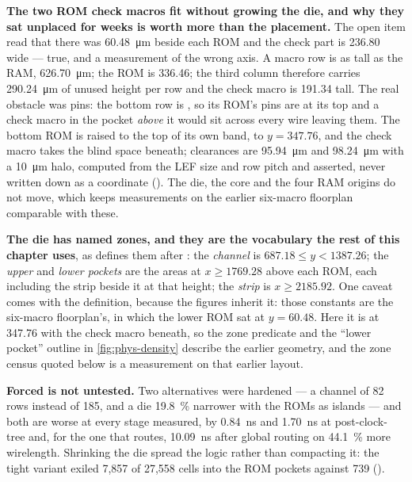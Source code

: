 \textbf{The two ROM check macros fit without growing the die, and why
they sat unplaced for weeks is worth more than the placement.} The open
item read that there was \qty{60.48}{\um} beside each ROM and
the check part is \num{236.80} wide --- true, and a measurement of the
wrong axis. A macro row is as tall as the RAM,
\qty{626.70}{\um}; the ROM is \num{336.46}; the third column
therefore carries \qty{290.24}{\um} of unused height per row
and the check macro is \num{191.34} tall. The real obstacle was pins:
the bottom row is , so its ROM's pins are at its top and a
check macro in the pocket \emph{above} it would sit across every wire
leaving them. The bottom ROM is raised to the top of its own band, to
$y=347.76$, and the check macro takes the blind space beneath;
clearances are \qty{95.94}{\um} and \qty{98.24}{\um}
with a \qty{10}{\um} halo, computed from the LEF size and row
pitch and asserted, never written down as a coordinate
(). The die, the core and the four RAM origins do
not move, which keeps measurements on the earlier six-macro floorplan
comparable with these.

\textbf{The die has named zones, and they are the vocabulary the rest of
this chapter uses}, as 
defines them after : the \emph{channel} is
$687.18 \le y < 1387.26$; the \emph{upper} and \emph{lower pockets} are
the areas at $x \ge 1769.28$ above each ROM, each including the strip
beside it at that height; the \emph{strip} is $x \ge 2185.92$. One
caveat comes with the definition, because the figures inherit it: those
constants are the six-macro floorplan's, in which the lower ROM sat at
$y=60.48$. Here it is at \num{347.76} with the check macro beneath, so
the zone predicate and the ``lower pocket'' outline in
\cref{fig:phys-density} describe the earlier geometry, and the zone
census quoted below is a measurement on that earlier layout.

\textbf{Forced is not untested.} Two alternatives were hardened --- a
channel of 82 rows instead of 185, and a die \qty{19.8}{\percent}
narrower with the ROMs as islands --- and both are worse at every stage
measured, by \qty{0.84}{\nano\second} and \qty{1.70}{\nano\second} at
post-clock-tree and, for the one that routes, \qty{10.09}{\nano\second}
after global routing on \qty{44.1}{\percent} more wirelength. Shrinking
the die spread the logic rather than compacting it: the tight variant
exiled 7,857 of 27,558 cells into the ROM pockets against 739
().

